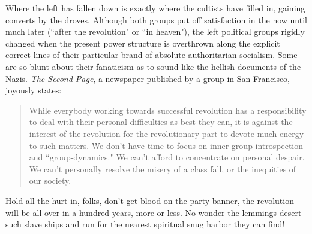 Where the left has fallen down is exactly where the cultists have filled in, gaining converts by the droves. Although both groups put off satisfaction in the now until much later (``after the revolution" or ``in heaven"), the left political groups rigidly changed when the present power structure is overthrown along the explicit correct lines of their particular brand of absolute authoritarian socialism. Some are so blunt about their fanaticism as to sound like the hellish documents of the Nazis. \emph{The Second Page}, a newspaper published by a group in San Francisco, joyously states:
\blockquote{While everybody working towards successful revolution has a responsibility to deal with their personal difficulties as best they can, it is against the interest of the revolution for the revolutionary part to devote much energy to such matters. We don't have time to focus on inner group introspection and ``group-dynamics." We can't afford to concentrate on personal despair. We can't personally resolve the misery of a class fall, or the inequities of our society.}
Hold all the hurt in, folks, don't get blood on the party banner, the revolution will be all over in a hundred years, more or less. No wonder the lemmings desert such slave ships and run for the nearest spiritual snug harbor they can find!
